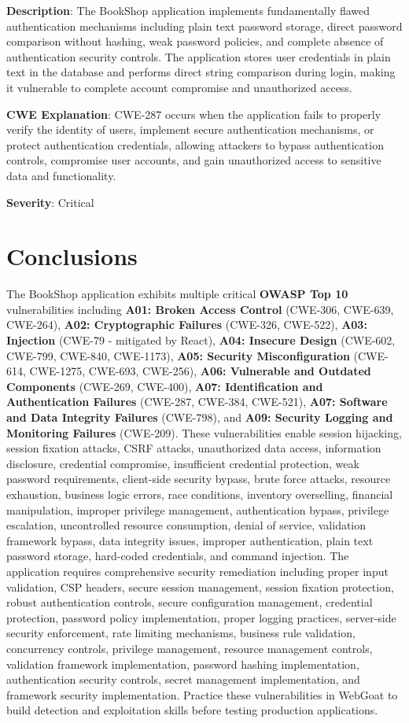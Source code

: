 \documentclass[]{UCD_CS_FYP_Report}
\begin{document}
\textbf{Description}: The BookShop application implements fundamentally flawed authentication mechanisms including plain text password storage, direct password comparison without hashing, weak password policies, and complete absence of authentication security controls. The application stores user credentials in plain text in the database and performs direct string comparison during login, making it vulnerable to complete account compromise and unauthorized access.

\textbf{CWE Explanation}: CWE-287 occurs when the application fails to properly verify the identity of users, implement secure authentication mechanisms, or protect authentication credentials, allowing attackers to bypass authentication controls, compromise user accounts, and gain unauthorized access to sensitive data and functionality.

\textbf{Severity}: Critical


\chapter{Conclusions}

The BookShop application exhibits multiple critical \textbf{OWASP Top 10} vulnerabilities including \textbf{A01: Broken Access Control} (CWE-306, CWE-639, CWE-264), \textbf{A02: Cryptographic Failures} (CWE-326, CWE-522), \textbf{A03: Injection} (CWE-79 - mitigated by React), \textbf{A04: Insecure Design} (CWE-602, CWE-799, CWE-840, CWE-1173), \textbf{A05: Security Misconfiguration} (CWE-614, CWE-1275, CWE-693, CWE-256), \textbf{A06: Vulnerable and Outdated Components} (CWE-269, CWE-400), \textbf{A07: Identification and Authentication Failures} (CWE-287, CWE-384, CWE-521), \textbf{A07: Software and Data Integrity Failures} (CWE-798), and \textbf{A09: Security Logging and Monitoring Failures} (CWE-209). These vulnerabilities enable session hijacking, session fixation attacks, CSRF attacks, unauthorized data access, information disclosure, credential compromise, insufficient credential protection, weak password requirements, client-side security bypass, brute force attacks, resource exhaustion, business logic errors, race conditions, inventory overselling, financial manipulation, improper privilege management, authentication bypass, privilege escalation, uncontrolled resource consumption, denial of service, validation framework bypass, data integrity issues, improper authentication, plain text password storage, hard-coded credentials, and command injection. The application requires comprehensive security remediation including proper input validation, CSP headers, secure session management, session fixation protection, robust authentication controls, secure configuration management, credential protection, password policy implementation, proper logging practices, server-side security enforcement, rate limiting mechanisms, business rule validation, concurrency controls, privilege management, resource management controls, validation framework implementation, password hashing implementation, authentication security controls, secret management implementation, and framework security implementation. Practice these vulnerabilities in WebGoat to build detection and exploitation skills before testing production applications.
\end{document}
